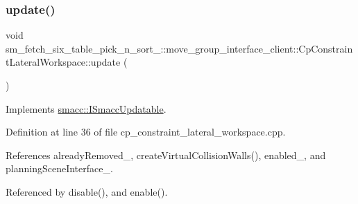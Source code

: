 \subsubsection{\texorpdfstring{update()}{update()}}
{\footnotesize\ttfamily void sm\+\_\+fetch\+\_\+six\+\_\+table\+\_\+pick\+\_\+n\+\_\+sort\+\_\+::move\+\_\+group\+\_\+interface\+\_\+client\+::\+Cp\+Constraint\+Lateral\+Workspace\+::update (\begin{DoxyParamCaption}{ }\end{DoxyParamCaption})\hspace{0.3cm}{\ttfamily [virtual]}}



Implements \hyperlink{classsmacc_1_1ISmaccUpdatable_a84ee0520cbefdb1d412bed54650b028e}{smacc\+::\+I\+Smacc\+Updatable}.



Definition at line 36 of file cp\+\_\+constraint\+\_\+lateral\+\_\+workspace.\+cpp.



References already\+Removed\+\_\+, create\+Virtual\+Collision\+Walls(), enabled\+\_\+, and planning\+Scene\+Interface\+\_\+.



Referenced by disable(), and enable().


